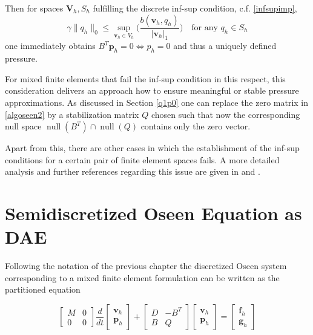 \documentclass[a4paper,10pt,BCOR=15mm]{scrbook}
\DeclareMathOperator{\nulli}{null}
\providecommand{\abs}[1]{\lvert#1\rvert}
\providecommand{\norm}[1]{\lVert#1 \rVert}
\begin{document}
Then for spaces $\mathbf V_h, S_h$ fulfilling the discrete inf-sup condition, c.f. \eqref{infsupimp},
\begin{equation}\label{discinfsupimp}
\gamma \norm{q_h}_0 \leq \sup_{\mathbf v_h \in V_h } \biggl ( \frac{b(\mathbf v_h, q_h)}{\abs{\mathbf v_h}_1 } \biggr ) \quad \text{for any } q_h \in S_h
\end{equation}
one immediately obtains $B^T \mathbf p_h = 0 \Leftrightarrow p_h = 0$ and thus a uniquely defined pressure.

For mixed finite elements that fail the inf-sup condition in this respect, this consideration delivers an approach how to ensure meaningful or stable pressure approximations. As discussed in Section \ref{q1p0} one can replace the zero matrix in \eqref{algoseen2} by a stabilization matrix $Q$ chosen such that now the corresponding null space $\nulli (B^T) \cap \nulli (Q)$ contains only the zero vector.

Apart from this, there are other cases in which the establishment of the inf-sup conditions for a certain pair of finite element spaces fails. A more detailed analysis and further references regarding this issue are given in \cite[Ch. 3.13.2]{gre2} and \cite[p. 21]{gunz}.

\section{Semidiscretized Oseen Equation as DAE}\label{osasdae}
Following the notation of the previous chapter the discretized Oseen system corresponding to a mixed finite element formulation can be written as the partitioned equation

\begin{equation}\label{soe1}
	\begin{bmatrix} M& 0 \\ 0& 0 \end{bmatrix} \frac{d}{dt} {\begin{bmatrix} \mathbf v_h \\ \mathbf p_h  \end{bmatrix}} + \begin{bmatrix} D& -B^T \\  B& Q \end{bmatrix} \begin{bmatrix} \mathbf v_h \\ \mathbf p_h  \end{bmatrix} = \begin{bmatrix} \mathbf f_h \\ \mathbf g_h \end{bmatrix} 
\end{equation}
\end{document}
